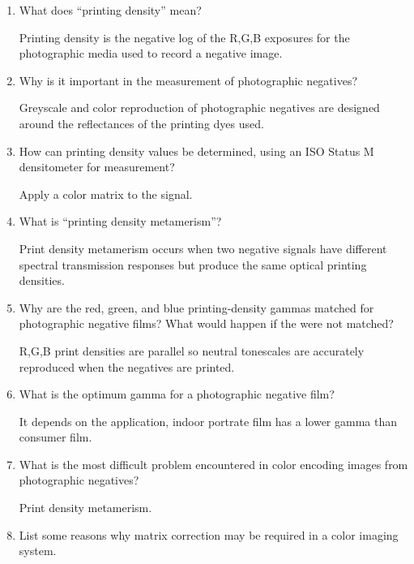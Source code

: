 \begin{enumerate}
 \item
  What does “printing density” mean? \newline
 \par Printing density is the negative log of the R,G,B exposures for the photographic media used to record a negative image. \newline
 \item
  Why is it important in the measurement of photographic negatives? \newline
 \par Greyscale and color reproduction of photographic negatives are designed around the reflectances of the printing dyes used. \newline
 \item
  How can printing density values be determined, using an ISO Status M densitometer for measurement? \newline
 \par Apply a color matrix to the signal. \newline
 \item
  What is “printing density metamerism”? \newline
 \par Print density metamerism occurs when two negative signals have different spectral transmission responses but produce the same optical printing densities. \newline
 \item
  Why are the red, green, and blue printing-density gammas matched for photographic negative films? What would happen if the were not matched? \newline
 \par R,G,B print densities are parallel so neutral tonescales are accurately reproduced when the negatives are printed. \newline
 \item
  What is the optimum gamma for a photographic negative film? \newline
 \par It depends on the application, indoor portrate film has a lower gamma than consumer film. \newline
 \item
 What is the most difficult problem encountered in color encoding images from photographic negatives? \newline
 \par Print density metamerism.
 \item
 List some reasons why matrix correction may be required in a color imaging system. \newline

\end{enumerate}
